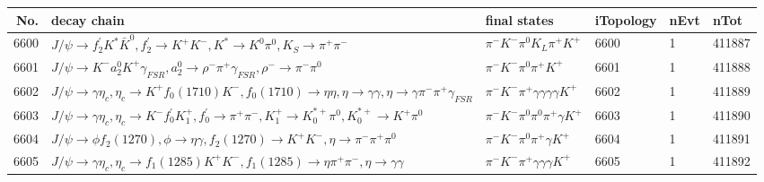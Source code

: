 \begin{table}[htbp] 
\begin{center}
\begin{small}
\begin{tabular}{rlllll}\hline\hline
 No. & decay chain & final states &  iTopology & nEvt & nTot \\\hline
6600&$J/\psi       \rightarrow f_2^{'}       K^{*}          \bar{K}^{0}   , f_2^{'}        \rightarrow K^{+}          K^{-}          , K^{*}           \rightarrow K^{0}          \pi^{0}        , K_{S}           \rightarrow \pi^{+}        \pi^{-}        $&$\pi^{-}        K^{-}          \pi^{0}        K_{L}          \pi^{+}        K^{+}          $& 6600&    1&411887\\
6601&$J/\psi       \rightarrow K^{-}          a_{2}^{0}      K^{+}          \gamma_{FSR} , a_{2}^{0}       \rightarrow \rho^{-}      \pi^{+}        \gamma_{FSR} , \rho^{-}       \rightarrow \pi^{-}        \pi^{0}        $&$\pi^{-}        K^{-}          \pi^{0}        \pi^{+}        K^{+}          $& 6601&    1&411888\\
6602&$J/\psi       \rightarrow \gamma       \eta_{c}    , \eta_{c}     \rightarrow K^{+}          f_{0}(1710)    K^{-}          , f_{0}(1710)     \rightarrow \eta          \eta          , \eta           \rightarrow \gamma       \gamma       , \eta           \rightarrow \gamma       \pi^{-}        \pi^{+}        \gamma_{FSR} $&$\pi^{-}        K^{-}          \pi^{+}        \gamma       \gamma       \gamma       \gamma       K^{+}          $& 6602&    1&411889\\
6603&$J/\psi       \rightarrow \gamma       \eta_{c}    , \eta_{c}     \rightarrow K^{-}          f^{'}_{0}     K_1^{+}        , f^{'}_{0}      \rightarrow \pi^{+}        \pi^{-}        , K_1^{+}         \rightarrow K_{0}^{*+}     \pi^{0}        , K_{0}^{*+}      \rightarrow K^{+}          \pi^{0}        $&$\pi^{-}        K^{-}          \pi^{0}        \pi^{0}        \pi^{+}        \gamma       K^{+}          $& 6603&    1&411890\\
6604&$J/\psi       \rightarrow \phi           f_{2}(1270)    , \phi            \rightarrow \eta          \gamma       , f_{2}(1270)     \rightarrow K^{+}          K^{-}          , \eta           \rightarrow \pi^{-}        \pi^{+}        \pi^{0}        $&$\pi^{-}        K^{-}          \pi^{0}        \pi^{+}        \gamma       K^{+}          $& 6604&    1&411891\\
6605&$J/\psi       \rightarrow \gamma       \eta_{c}    , \eta_{c}     \rightarrow f_{1}(1285)    K^{+}          K^{-}          , f_{1}(1285)     \rightarrow \eta          \pi^{+}        \pi^{-}        , \eta           \rightarrow \gamma       \gamma       $&$\pi^{-}        K^{-}          \pi^{+}        \gamma       \gamma       \gamma       K^{+}          $& 6605&    1&411892\\

\end{tabular}
\end{small}
\end{center}
\end{table}
